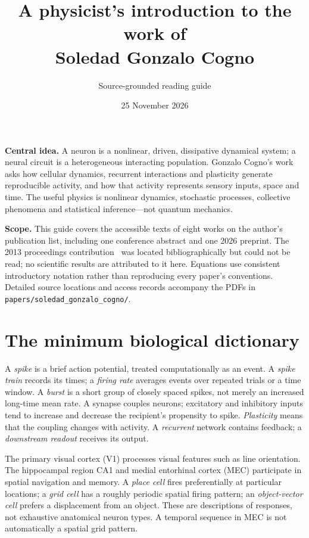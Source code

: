 \documentclass[11pt,a4paper]{article}
\title{A physicist's introduction to the work of\\Soledad Gonzalo Cogno}
\author{Source-grounded reading guide}
\date{25 November 2026}
\begin{document}
\maketitle
\noindent\textbf{Central idea.} A neuron is a nonlinear, driven, dissipative dynamical system; a neural circuit is a heterogeneous interacting population. Gonzalo Cogno's work asks how cellular dynamics, recurrent interactions and plasticity generate reproducible activity, and how that activity represents sensory inputs, space and time. The useful physics is nonlinear dynamics, stochastic processes, collective phenomena and statistical inference---not quantum mechanics.

\smallskip\noindent\textbf{Scope.} This guide covers the accessible texts of eight works on the author's publication list, including one conference abstract and one 2026 preprint. The 2013 proceedings contribution~\cite{noise} was located bibliographically but could not be read; no scientific results are attributed to it here. Equations use consistent introductory notation rather than reproducing every paper's conventions. Detailed source locations and access records accompany the PDFs in \texttt{papers/soledad\_gonzalo\_cogno/}.

\section{The minimum biological dictionary}
A \emph{spike} is a brief action potential, treated computationally as an event. A \emph{spike train} records its times; a \emph{firing rate} averages events over repeated trials or a time window. A \emph{burst} is a short group of closely spaced spikes, not merely an increased long-time mean rate. A synapse couples neurons; excitatory and inhibitory inputs tend to increase and decrease the recipient's propensity to spike. \emph{Plasticity} means that the coupling changes with activity. A \emph{recurrent} network contains feedback; a \emph{downstream readout} receives its output.

The primary visual cortex (V1) processes visual features such as line orientation. The hippocampal region CA1 and medial entorhinal cortex (MEC) participate in spatial navigation and memory. A \emph{place cell} fires preferentially at particular locations; a \emph{grid cell} has a roughly periodic spatial firing pattern; an \emph{object-vector cell} prefers a displacement from an object. These are descriptions of responses, not exhaustive anatomical neuron types. A temporal sequence in MEC is not automatically a spatial grid pattern.
\end{document}
